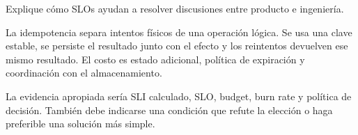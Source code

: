 \documentclass[variant=guia,cover=institutional,mode=screen]{ua-engineering-v6-article}
\begin{document}
\begin{uaexercise}
Explique cómo SLOs ayudan a resolver discusiones entre producto e ingeniería.
\end{uaexercise}
\begin{uaanswer}
La idempotencia separa intentos físicos de una operación lógica. Se usa una clave estable, se persiste el resultado junto con el efecto y los reintentos devuelven ese mismo resultado. El costo es estado adicional, política de expiración y coordinación con el almacenamiento.

La evidencia apropiada sería SLI calculado, SLO, budget, burn rate y política de decisión. También debe indicarse una condición que refute la elección o haga preferible una solución más simple.
\end{uaanswer}
\end{document}
